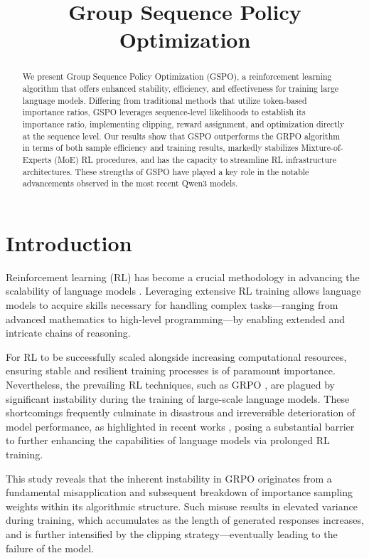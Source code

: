 \title{Group Sequence Policy Optimization}

\begin{abstract}
We present Group Sequence Policy Optimization (GSPO), a reinforcement learning algorithm that offers enhanced stability, efficiency, and effectiveness for training large language models. Differing from traditional methods that utilize token-based importance ratios, GSPO leverages sequence-level likelihoods to establish its importance ratio, implementing clipping, reward assignment, and optimization directly at the sequence level. Our results show that GSPO outperforms the GRPO algorithm in terms of both sample efficiency and training results, markedly stabilizes Mixture-of-Experts (MoE) RL procedures, and has the capacity to streamline RL infrastructure architectures. These strengths of GSPO have played a key role in the notable advancements observed in the most recent Qwen3 models.
\end{abstract}

\section{Introduction}
\label{sec:intro}

Reinforcement learning (RL) has become a crucial methodology in advancing the scalability of language models \citep{o1,dpsk-r1,qwq32b,qwen3}. Leveraging extensive RL training allows language models to acquire skills necessary for handling complex tasks—ranging from advanced mathematics to high-level programming—by enabling extended and intricate chains of reasoning.

For RL to be successfully scaled alongside increasing computational resources, ensuring stable and resilient training processes is of paramount importance. Nevertheless, the prevailing RL techniques, such as GRPO \citep{grpo}, are plagued by significant instability during the training of large-scale language models. These shortcomings frequently culminate in disastrous and irreversible deterioration of model performance, as highlighted in recent works \citep{qwen3, minimax-m1}, posing a substantial barrier to further enhancing the capabilities of language models via prolonged RL training.

This study reveals that the inherent instability in GRPO originates from a fundamental misapplication and subsequent breakdown of importance sampling weights within its algorithmic structure. Such misuse results in elevated variance during training, which accumulates as the length of generated responses increases, and is further intensified by the clipping strategy—eventually leading to the failure of the model.

